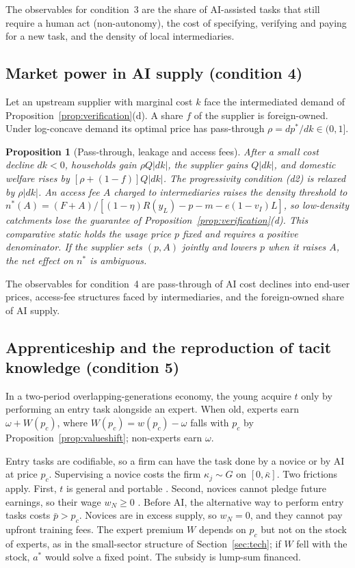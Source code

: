\documentclass[12pt]{article}
\newtheorem{proposition}{Proposition}
\theoremstyle{remark}
\begin{document}
The observables for condition~3 are the share of AI-assisted tasks that still require a human act (non-autonomy), the cost of specifying, verifying and paying for a new task, and the density of local intermediaries.

\subsection{Market power in AI supply (condition 4)}\label{sec:market}

Let an upstream supplier with marginal cost $k$ face the intermediated demand of Proposition~\ref{prop:verification}(d). A share $f$ of the supplier is foreign-owned. Under log-concave demand its optimal price has pass-through $\rho=dp^*/dk\in(0,1]$.

\begin{proposition}[Pass-through, leakage and access fees]\label{prop:market}
After a small cost decline $dk<0$, households gain $\rho Q|dk|$, the supplier gains $Q|dk|$, and domestic welfare rises by $[\rho+(1-f)]Q|dk|$. The progressivity condition (d2) is relaxed by $\rho|dk|$. An access fee $A$ charged to intermediaries raises the density threshold to $n^*(A)=(F+A)/[(1-\eta)R(y_L)-p-m-e(1-v_I)L]$, so low-density catchments lose the guarantee of Proposition~\ref{prop:verification}(d). This comparative static holds the usage price $p$ fixed and requires a positive denominator. If the supplier sets $(p,A)$ jointly and lowers $p$ when it raises $A$, the net effect on $n^*$ is ambiguous.
\end{proposition}

The observables for condition~4 are pass-through of AI cost declines into end-user prices, access-fee structures faced by intermediaries, and the foreign-owned share of AI supply.

\subsection{Apprenticeship and the reproduction of tacit knowledge (condition 5)}\label{sec:apprentice}

In a two-period overlapping-generations economy, the young acquire $t$ only by performing an entry task alongside an expert. When old, experts earn $\omega+W(p_c)$, where $W(p_c)=w(p_c)-\omega$ falls with $p_c$ by Proposition~\ref{prop:valueshift}; non-experts earn $\omega$.

Entry tasks are codifiable, so a firm can have the task done by a novice or by AI at price $p_c$. Supervising a novice costs the firm $\kappa_j\sim G$ on $[0,\bar\kappa]$. Two frictions apply. First, $t$ is general and portable \citep{becker1962investment}. Second, novices cannot pledge future earnings, so their wage $w_N\ge0$ \citep{ide2025automation}. Before AI, the alternative way to perform entry tasks costs $\bar p>p_c$. Novices are in excess supply, so $w_N=0$, and they cannot pay upfront training fees. The expert premium $W$ depends on $p_c$ but not on the stock of experts, as in the small-sector structure of Section~\ref{sec:tech}; if $W$ fell with the stock, $a^*$ would solve a fixed point. The subsidy is lump-sum financed.
\end{document}
